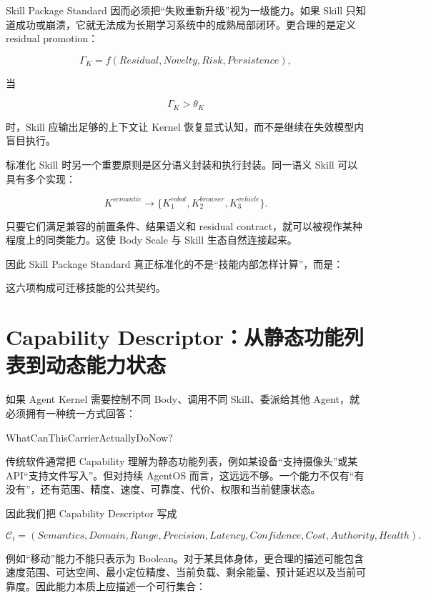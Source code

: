 Skill Package Standard 因而必须把``失败重新升级''视为一级能力。如果 Skill 只知道成功或崩溃，它就无法成为长期学习系统中的成熟局部闭环。更合理的是定义 residual promotion：

\[
\Gamma_K
=
f(
Residual,
Novelty,
Risk,
Persistence
),
\]

当

\[
\Gamma_K>\theta_K
\]

时，Skill 应输出足够的上下文让 Kernel 恢复显式认知，而不是继续在失效模型内盲目执行。

标准化 Skill 时另一个重要原则是区分语义封装和执行封装。同一语义 Skill 可以具有多个实现：

\[
K^{semantic}
\rightarrow
\{
K_1^{robot},
K_2^{browser},
K_3^{vehicle}
\}.
\]

只要它们满足兼容的前置条件、结果语义和 residual contract，就可以被视作某种程度上的同类能力。这使 Body Scale 与 Skill 生态自然连接起来。

因此 Skill Package Standard 真正标准化的不是``技能内部怎样计算''，而是：

\begin{statementbox}
\centering
{}
\end{statementbox}

这六项构成可迁移技能的公共契约。

\section{Capability Descriptor：从静态功能列表到动态能力状态}

如果 Agent Kernel 需要控制不同 Body、调用不同 Skill、委派给其他 Agent，就必须拥有一种统一方式回答：

\begin{statementbox}
WhatCanThisCarrierActuallyDoNow?
\end{statementbox}

传统软件通常把 Capability 理解为静态功能列表，例如某设备``支持摄像头''或某 API``支持文件写入''。但对持续 AgentOS 而言，这远远不够。一个能力不仅有``有没有''，还有范围、精度、速度、可靠度、代价、权限和当前健康状态。

因此我们把 Capability Descriptor 写成

\[
\mathcal C_i
=
(
Semantics,
Domain,
Range,
Precision,
Latency,
Confidence,
Cost,
Authority,
Health
).
\]

例如``移动''能力不能只表示为 Boolean。对于某具体身体，更合理的描述可能包含速度范围、可达空间、最小定位精度、当前负载、剩余能量、预计延迟以及当前可靠度。因此能力本质上应描述一个可行集合：

